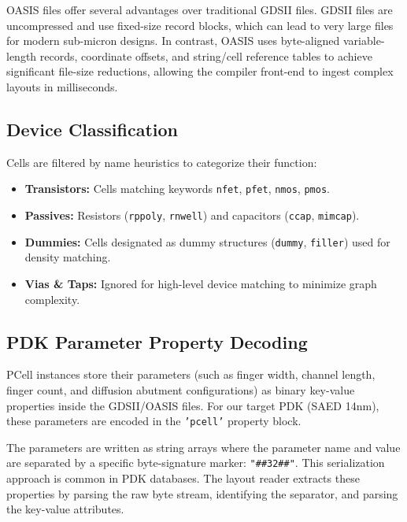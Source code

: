 OASIS files offer several advantages over traditional GDSII files. GDSII files are uncompressed and use fixed-size record blocks, which can lead to very large files for modern sub-micron designs. In contrast, OASIS uses byte-aligned variable-length records, coordinate offsets, and string/cell reference tables to achieve significant file-size reductions, allowing the compiler front-end to ingest complex layouts in milliseconds.

\subsection{Device Classification}
Cells are filtered by name heuristics to categorize their function:
\begin{itemize}
    \item \textbf{Transistors:} Cells matching keywords \texttt{nfet}, \texttt{pfet}, \texttt{nmos}, \texttt{pmos}.
    \item \textbf{Passives:} Resistors (\texttt{rppoly}, \texttt{rnwell}) and capacitors (\texttt{ccap}, \texttt{mimcap}).
    \item \textbf{Dummies:} Cells designated as dummy structures (\texttt{dummy}, \texttt{filler}) used for density matching.
    \item \textbf{Vias \& Taps:} Ignored for high-level device matching to minimize graph complexity.
\end{itemize}

\subsection{PDK Parameter Property Decoding}
PCell instances store their parameters (such as finger width, channel length, finger count, and diffusion abutment configurations) as binary key-value properties inside the GDSII/OASIS files. For our target PDK (SAED 14nm), these parameters are encoded in the \texttt{'pcell'} property block.

The parameters are written as string arrays where the parameter name and value are separated by a specific byte-signature marker: \texttt{"\#\#32\#\#"}. This serialization approach is common in PDK databases. The layout reader extracts these properties by parsing the raw byte stream, identifying the separator, and parsing the key-value attributes.

